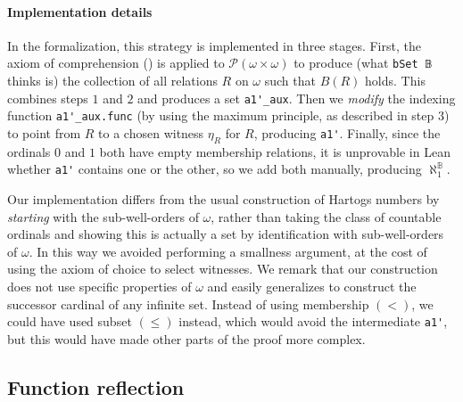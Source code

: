 \documentclass[sigplan,10pt,review, anonymous]{acmart}
\newcommand{\lil}{\lstinline}
\theoremstyle{definition}
\begin{document}
\paragraph{Implementation details}
In the formalization, this strategy is implemented in three stages.
First, the axiom of comprehension () is applied to \(\mathcal{P}(\omega \times \omega)\) to produce (what \lil{bSet 𝔹} thinks is) the collection of all relations \(R\) on \(\omega\) such that \(B(R)\) holds.
This combines steps \(1\) and \(2\) and produces a set \lil{a1'_aux}. Then we \emph{modify} the indexing function \lil{a1'_aux.func} (by using the maximum principle, as described in step \(3\)) to point from \(R\) to a chosen witness \(\eta_R\) for \(R\), producing \lil{a1'}.
Finally, since the ordinals \(0\) and \(1\) both have empty membership relations, it is unprovable in Lean whether \lil{a1'} contains one or the other, so we add both manually, producing \(\aleph_1^{\mathbb{B}}\).

Our implementation differs from the usual construction of Hartogs numbers by \emph{starting} with the sub-well-orders of \(\omega\), rather than taking the class of countable ordinals and showing this is actually a set by identification with sub-well-orders of \(\omega\). In this way we avoided performing a smallness argument, at the cost of using the axiom of choice to select witnesses. We remark that our construction does not use specific properties of \(\omega\) and easily generalizes to construct the successor cardinal of any infinite set. Instead of using membership \((<)\), we could have used subset \((\leq)\) instead, which would avoid the intermediate \lil{a1'}, but this would have made other parts of the proof more complex.


\subsection{Function reflection} \label{subsect:function-reflection}
\end{document}
